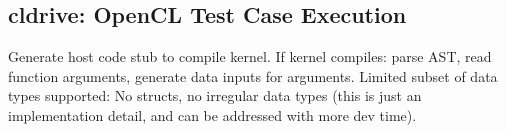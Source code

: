 \subsection{cldrive: OpenCL Test Case Execution}

Generate host code stub to compile kernel. If kernel compiles: parse AST, read function arguments, generate data inputs for arguments. Limited subset of data types supported: No structs, no irregular data types (this is just an implementation detail, and can be addressed with more dev time).










\printbibliography

